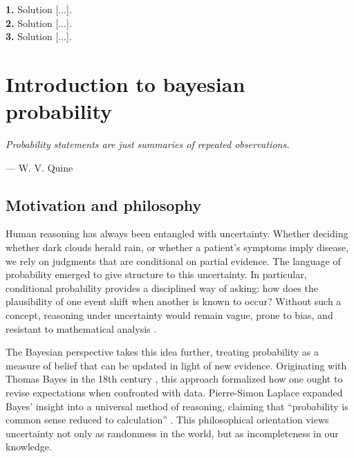 \documentclass{book}
\begin{document}
\textbf{1.} Solution [...].\\

\textbf{2.} Solution [...].\\

\textbf{3.} Solution [...].\\



\chapter{Introduction to bayesian probability}

\epigraph{\textit{Probability statements are just summaries of repeated observations.}}{— W. V. Quine}

\section{Motivation and philosophy}

Human reasoning has always been entangled with uncertainty. Whether deciding whether dark clouds herald rain, or whether a patient’s symptoms imply disease, we rely on judgments that are conditional on partial evidence. The language of probability emerged to give structure to this uncertainty. In particular, conditional probability provides a disciplined way of asking: how does the plausibility of one event shift when another is known to occur? Without such a concept, reasoning under uncertainty would remain vague, prone to bias, and resistant to mathematical analysis \cite{hacking1965logic}.

\medskip

The Bayesian perspective takes this idea further, treating probability as a measure of belief that can be updated in light of new evidence. Originating with Thomas Bayes in the 18th century \cite{bayes1763essay}, this approach formalized how one ought to revise expectations when confronted with data. Pierre-Simon Laplace expanded Bayes’ insight into a universal method of reasoning, claiming that “probability is common sense reduced to calculation” \cite{laplace1814philosophical}. This philosophical orientation views uncertainty not only as randomness in the world, but as incompleteness in our knowledge.

\medskip
\end{document}
